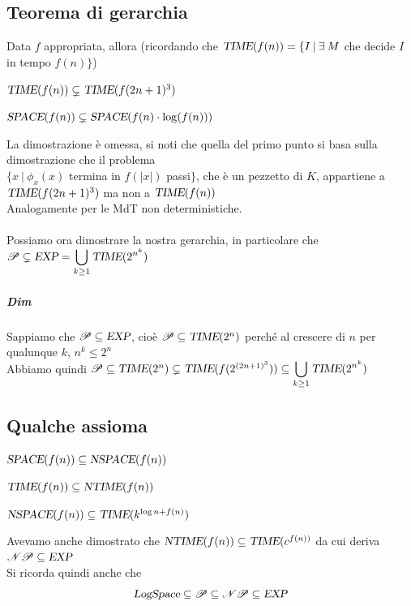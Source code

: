 \documentclass[10pt]{book}
\begin{document}
\subsection{Teorema di gerarchia}
Data $f$ appropriata, allora (ricordando che $\textsl{TIME}(f(n))=\{I\:|\:\exists\:M$ che decide $I$ in tempo $f(n)\}$)
\begin{list}{}{}
	\item $\textsl{TIME}(f(n))\subsetneq\textsl{TIME}(f(2n + 1)^3)$
	\item $\textsl{SPACE}(f(n))\subsetneq\textsl{SPACE}(f(n)\cdot\log(f(n)))$
\end{list}
La dimostrazione è omessa, si noti che quella del primo punto si basa sulla dimostrazione che il problema\\$\{x\:|\:\phi_x(x)$ termina in $f(|x|)$ passi$\}$, che è un pezzetto di $K$, appartiene a $\textsl{TIME}(f(2n+1)^3)$ ma non a $\textsl{TIME}(f(n))$\\
Analogamente per le MdT non deterministiche.
\paragraph{} Possiamo ora dimostrare la nostra gerarchia, in particolare che $\mathscr{P} \subsetneq \textsl{EXP} = \mathlarger{\bigcup_{k \geq 1}\textsl{TIME}(2^{n^k})}$
\subparagraph{Dim} Sappiamo che $\mathscr{P} \subseteq \textsl{EXP}$, cioè $\mathscr{P} \subseteq \textsl{TIME}(2^n)$ perché al crescere di $n$ per qualunque $k$, $n^k \leq 2^n$\\
Abbiamo quindi $\mathscr{P} \subseteq \textsl{TIME}(2^n) \subsetneq\textsl{TIME}(f(2^{(2n + 1)^3})) \subseteq \mathlarger{\bigcup_{k \geq 1}\textsl{TIME}(2^{n^k})}$
\subsection{Qualche assioma}
\begin{list}{-}{}
	\item $\textsl{SPACE}(f(n))\subseteq\textsl{NSPACE}(f(n))$
	\item $\textsl{TIME}(f(n))\subseteq\textsl{NTIME}(f(n))$
	\item $\textsl{NSPACE}(f(n))\subseteq\textsl{TIME}(k^{\log n + f(n)})$
\end{list}
Avevamo anche dimostrato che $\textsl{NTIME}(f(n)) \subseteq \textsl{TIME}(c^{f(n))}$ da cui deriva $\mathscr{NP} \subseteq \textsl{EXP}$\\
Si ricorda quindi anche che
$$\textsl{LogSpace} \subseteq \mathscr{P} \subseteq \mathscr{NP} \subseteq \textsl{EXP}$$
\pagebreak
\end{document}
